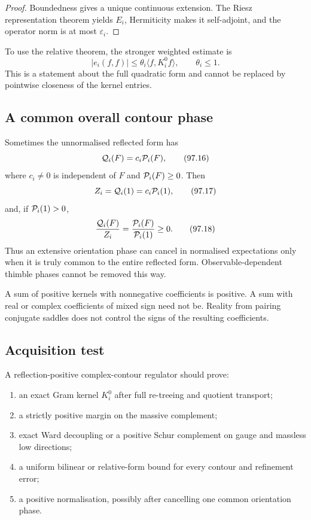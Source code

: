 \documentclass[11pt]{article}
\begin{document}
\begin{proof}
Boundedness gives a unique continuous extension.  The Riesz
representation theorem yields \(E_i\), Hermiticity makes it
self-adjoint, and the operator norm is at most \(\varepsilon_i\).
\end{proof}

To use the relative theorem, the stronger weighted estimate is
\[
 |e_i(f,f)|
       \le\theta_i\langle f,K_i^0f\rangle,\qquad
                              \theta_i\le1.                  \tag{97.15}
\]
This is a statement about the full quadratic form and cannot be
replaced by pointwise closeness of the kernel entries.

\subsection{A common overall contour phase}

Sometimes the unnormalised reflected form has
\[
                              {\cal Q}_i(F)
                              =c_i{\cal P}_i(F),             \tag{97.16}
\]
where \(c_i\ne0\) is independent of \(F\) and
\({\cal P}_i(F)\ge0\).  Then
\[
                              Z_i={\cal Q}_i(1)
                              =c_i{\cal P}_i(1),             \tag{97.17}
\]
and, if \({\cal P}_i(1)>0\),
\[
                 {{\cal Q}_i(F)\over Z_i}
                 ={{\cal P}_i(F)\over{\cal P}_i(1)}\ge0.     \tag{97.18}
\]
Thus an extensive orientation phase can cancel in normalised
expectations only when it is truly common to the entire reflected
form.  Observable-dependent thimble phases cannot be removed this
way.

\begin{warning}
\label{warn:v11v97-mixture}
A sum of positive kernels with nonnegative coefficients is positive.
A sum with real or complex coefficients of mixed sign need not be.
Reality from pairing conjugate saddles does not control the signs of
the resulting coefficients.
\end{warning}

\subsection{Acquisition test}

A reflection-positive complex-contour regulator should prove:
\begin{enumerate}
\item an exact Gram kernel \(K_i^0\) after full re-treeing and quotient
      transport;
\item a strictly positive margin on the massive complement;
\item exact Ward decoupling or a positive Schur complement on gauge
      and massless low directions;
\item a uniform bilinear or relative-form bound for every contour and
      refinement error;
\item a positive normalisation, possibly after cancelling one common
      orientation phase.
\end{enumerate}
\end{document}
